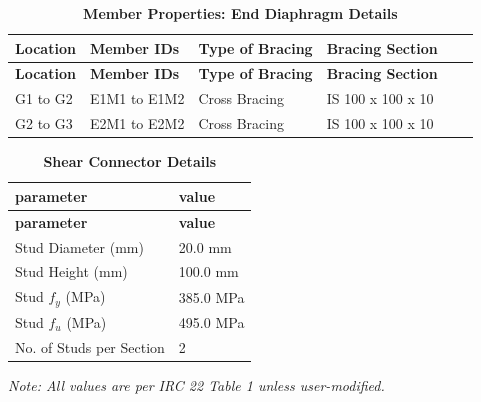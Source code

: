 \documentclass[12pt,a4paper]{report}
\numberwithin{table}{chapter}
\numberwithin{figure}{chapter}
\begin{document}
\vspace{0.4em}
\noindent
\setlength{\tabcolsep}{4pt}
\setlength\LTleft{0pt}
\setlength\LTright{\fill}

\begin{longtable}{|L{2.2cm}|L{2.2cm}|L{3.0cm}|L{2.5cm}|C{1.8cm}|C{1.8cm}|}
\caption{\textbf{Member Properties: End Diaphragm Details}}
\hline
\textbf{Location} & \textbf{Member IDs} & \textbf{Type of Bracing} & \textbf{Bracing Section} \\
\hline
\endfirsthead

\hline
\textbf{Location} & \textbf{Member IDs} & \textbf{Type of Bracing} & \textbf{Bracing Section} \\
\hline
\endhead
G1 to G2 & E1M1 to E1M2 & Cross Bracing & IS 100 x 100 x 10 \\[6pt]
\hline
G2 to G3 & E2M1 to E2M2 & Cross Bracing & IS 100 x 100 x 10 \\[6pt]
\hline
\end{longtable}



\label{subsec:shear-connectors}

\vspace{2.2em}

\vspace{0.4em}
\begin{longtable}{|L{5.5cm}|p{10.0cm}|}
\caption{\textbf{Shear Connector Details}}
\hline
\textbf{parameter} & \textbf{value} \\
\hline
\endfirsthead

\hline
\textbf{parameter} & \textbf{value} \\
\hline
\endhead
\textnormal{Stud Diameter (mm)} & 20.0 mm \\[6pt]
\hline
\textnormal{Stud Height (mm)} & 100.0 mm \\[6pt]
\hline
\textnormal{Stud $f_y$ (MPa)} & 385.0 MPa \\[6pt]
\hline
\textnormal{Stud $f_u$ (MPa)} & 495.0 MPa \\[6pt]
\hline
\textnormal{No. of Studs per Section} & 2 \\[6pt]
\hline
\end{longtable}



\label{subsec:safety-factors}

\vspace{2.2em}

\vspace{0.3em}
\noindent\textit{Note: All values are per IRC 22 Table 1 unless user-modified.}
\end{document}
